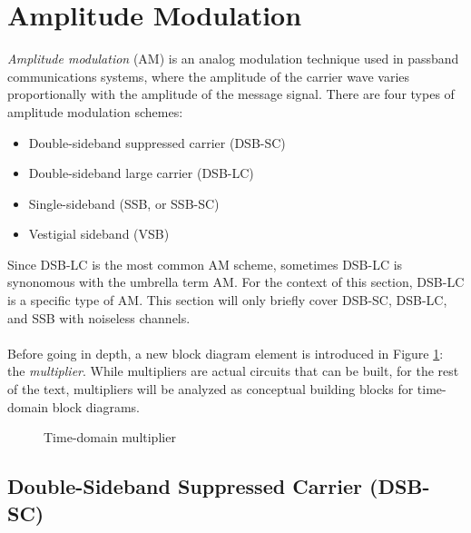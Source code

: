 \documentclass{report}
\begin{document}
\section{Amplitude Modulation}
\emph{Amplitude modulation} (AM) is an analog modulation technique used in passband communications systems, where the amplitude of the carrier wave varies proportionally with the amplitude 
of the message signal. There are four types of amplitude modulation schemes:
\begin{itemize}
    \item Double-sideband suppressed carrier (DSB-SC)
    \item Double-sideband large carrier (DSB-LC)
    \item Single-sideband (SSB, or SSB-SC)
    \item Vestigial sideband (VSB)
\end{itemize}
Since DSB-LC is the most common AM scheme, sometimes DSB-LC is synonomous with the umbrella term AM. For the context of this section, DSB-LC is a specific type of AM. This section will only briefly cover DSB-SC, DSB-LC, and SSB with noiseless channels.
\\ \\
Before going in depth, a new block diagram element is introduced in Figure \ref{multiplier}: the \emph{multiplier}. While multipliers are actual circuits that can be built, for the rest of the text, multipliers will be 
analyzed as conceptual building blocks for time-domain block diagrams.
\begin{figure}[!hbt]
    \centering
    \caption{Time-domain multiplier}
    \label{multiplier}
\end{figure}

\subsection{Double-Sideband Suppressed Carrier (DSB-SC)}
\end{document}
